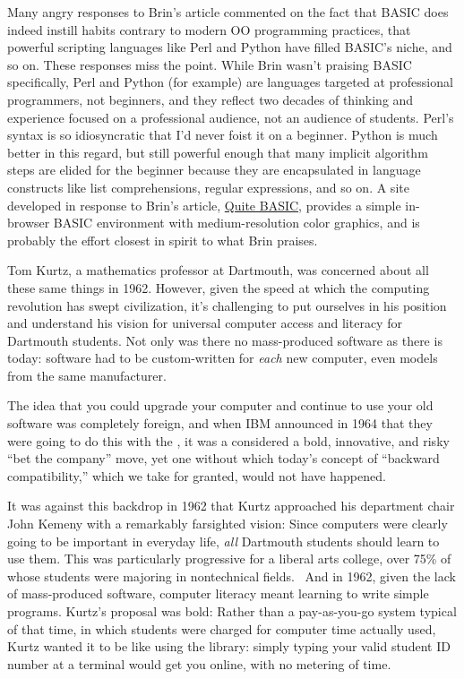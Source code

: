 \begin{geeknote}
Many angry responses to Brin's article commented on the fact that BASIC
does indeed instill habits contrary to modern OO programming practices,
that powerful scripting languages like Perl and Python have filled BASIC's
niche, and so on.  These responses miss the point.  While Brin wasn't
praising BASIC specifically, Perl and Python (for example) are languages
targeted at professional programmers, not beginners, and they
reflect two decades of thinking and experience focused on a professional audience,
not an audience of students.  Perl's syntax is so idiosyncratic that I'd
never foist it on a beginner. Python is much better in this regard, but
still powerful enough that many implicit algorithm steps are elided for
the beginner because they are encapsulated in language constructs like
list comprehensions, regular expressions, and so on.
A site developed in response to Brin's article, 
\href{http://quitebasic.com}{Quite BASIC}, provides a simple in-browser
BASIC environment with medium-resolution color graphics, and is probably
the effort closest in spirit to what Brin praises.

\end{geeknote}

Tom Kurtz, a mathematics professor at Dartmouth, was concerned about all
these same things in 1962.
However, given the speed at which the computing revolution has swept
civilization, it's challenging to put ourselves in his position and
understand his vision for universal computer access and literacy for
Dartmouth students.
Not only was there no mass-produced software as
there is today: software  had to be custom-written for \emph{each} new
computer, even models from the same manufacturer.  

  \begin{geeknote}
  The idea that
  you could upgrade your computer and continue to use your old software
  was completely foreign, and when IBM announced in 1964 that
  they were going to do this with the , it was a considered a bold,
  innovative, and risky ``bet the
  company'' move, yet one without which today's concept of ``backward
  compatibility,'' which we take for granted, would not have happened.
  \end{geeknote}

It was against this backdrop 
in 1962 that Kurtz approached
his department chair John Kemeny with a remarkably farsighted vision:
Since computers were clearly going to be important in everyday
life, \emph{all} Dartmouth students should learn to use them.  This was
particularly progressive for a liberal arts college,
over 75\% of whose students were majoring in nontechnical fields.~\cite{goto}
And in 1962, given the lack of mass-produced software,
computer literacy meant learning to
write simple programs.
Kurtz's proposal was bold: Rather than a
pay-as-you-go system typical of that time, in which students were
charged for computer time 
actually used,
Kurtz wanted it to be like using the library:
simply typing your valid student ID number at a terminal would get you
online, with no metering of time.

